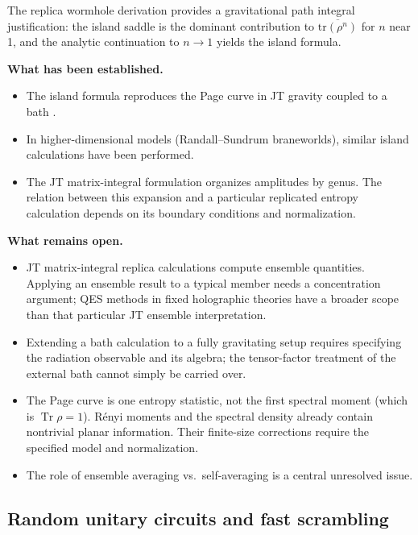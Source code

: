 \documentclass[11pt,letterpaper]{article}
\theoremstyle{plain}
\theoremstyle{definition}
\theoremstyle{remark}
\begin{document}
The replica wormhole derivation \cite{pssyetal2022} provides a
gravitational path integral justification: the island saddle is the dominant
contribution to $\overline{\mathrm{tr}(\rho^n)}$ for $n$ near 1, and the
analytic continuation to $n \to 1$ yields the island formula.

\medskip
\noindent
\textbf{What has been established.}
\begin{itemize}
  \item The island formula reproduces the Page curve in JT gravity
    coupled to a bath \cite{almheirietal2020islands, pssyetal2022}.
  \item In higher-dimensional models (Randall--Sundrum braneworlds),
    similar island calculations have been performed.
  \item The JT matrix-integral formulation organizes amplitudes by genus.
    The relation between this expansion and a particular replicated entropy
    calculation depends on its boundary conditions and normalization.
\end{itemize}

\medskip
\noindent
\textbf{What remains open.}
\begin{itemize}
  \item JT matrix-integral replica calculations compute ensemble quantities.
    Applying an ensemble result to a typical member needs a concentration
    argument; QES methods in fixed holographic theories have a broader scope
    than that particular JT ensemble interpretation.
  \item Extending a bath calculation to a fully gravitating setup requires
    specifying the radiation observable and its algebra; the tensor-factor
    treatment of the external bath cannot simply be carried over.
  \item The Page curve is one entropy statistic, not the first spectral moment
    (which is $\operatorname{Tr}\rho=1$).  R\'enyi moments and the spectral
    density already contain nontrivial planar information.  Their finite-size
    corrections require the specified model and normalization.
  \item The role of ensemble averaging vs.\ self-averaging is a central
    unresolved issue.
\end{itemize}

\subsection{Random unitary circuits and fast scrambling}
\label{app:random_unitary}
\end{document}
